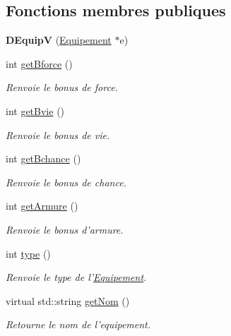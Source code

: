 \subsection*{Fonctions membres publiques}
\begin{DoxyCompactItemize}
\item 
\hypertarget{class_d_equip_v_acf6d9090ca81524f3c8118e4ff405416}{{\bfseries D\-Equip\-V} (\hyperlink{class_equipement}{Equipement} $\ast$e)}\label{class_d_equip_v_acf6d9090ca81524f3c8118e4ff405416}

\item 
int \hyperlink{class_d_equip_adb6645ce01c12a4cb3fe0b522ea6b25e}{get\-Bforce} ()
\begin{DoxyCompactList}\small\item\em Renvoie le bonus de force. \end{DoxyCompactList}\item 
int \hyperlink{class_d_equip_a085ea4ac21c238d8c147ff4e6d74794f}{get\-Bvie} ()
\begin{DoxyCompactList}\small\item\em Renvoie le bonus de vie. \end{DoxyCompactList}\item 
int \hyperlink{class_d_equip_a39407c92f0de87306a33f57fd22ce997}{get\-Bchance} ()
\begin{DoxyCompactList}\small\item\em Renvoie le bonus de chance. \end{DoxyCompactList}\item 
int \hyperlink{class_d_equip_a7b2c8227ae884c23ccc8f3a2e5702186}{get\-Armure} ()
\begin{DoxyCompactList}\small\item\em Renvoie le bonus d'armure. \end{DoxyCompactList}\item 
int \hyperlink{class_d_equip_a7c31f807517e5940e899780ac6d7a5c3}{type} ()
\begin{DoxyCompactList}\small\item\em Renvoie le type de l'\hyperlink{class_equipement}{Equipement}. \end{DoxyCompactList}\item 
virtual std\-::string \hyperlink{class_equipement_a0b0426a70bfce6e7c3efac605b75cd8e}{get\-Nom} ()
\begin{DoxyCompactList}\small\item\em Retourne le nom de l'equipement. \end{DoxyCompactList}\end{DoxyCompactItemize}
